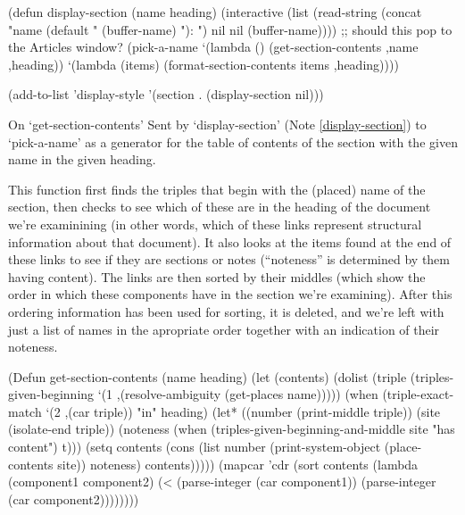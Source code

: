\begin{elisp}
(defun display-section (name heading)
  (interactive (list (read-string
                      (concat
                       "name (default "
                       (buffer-name) "): ")
                      nil nil (buffer-name))))
  ;; should this pop to the Articles window?
  (pick-a-name `(lambda ()
                  (get-section-contents
                   ,name ,heading))
               `(lambda (items)
                  (format-section-contents
                   items ,heading))))

(add-to-list 'display-style
             '(section . (display-section
                          nil)))
\end{elisp}

\begin{notate}{On `get-section-contents'} \label{get-section-contents}
Sent by `display-section' (Note \ref{display-section})
to `pick-a-name' as a generator for the table of contents
of the section with the given name in the given heading.

This function first finds the triples that begin with the
(placed) name of the section, then checks to see which of
these are in the heading of the document we're examinining
(in other words, which of these links represent structural
information about that document).  It also looks at the
items found at the end of these links to see if they are
sections or notes (``noteness'' is determined by them
having content).  The links are then sorted by their
middles (which show the order in which these components
have in the section we're examining).  After this ordering
information has been used for sorting, it is deleted, and
we're left with just a list of names in the apropriate
order together with an indication of their noteness.
\end{notate}

\begin{elisp}
(Defun get-section-contents (name heading)
  (let (contents)
    (dolist (triple (triples-given-beginning
                     `(1 ,(resolve-ambiguity
                           (get-places name)))))
      (when (triple-exact-match
             `(2 ,(car triple)) "in" heading)
        (let* ((number (print-middle triple))
               (site (isolate-end triple))
               (noteness
                (when (triples-given-beginning-and-middle
                       site "has content")
                  t)))
        (setq contents
              (cons (list number
                          (print-system-object
                           (place-contents site))
                          noteness)
                    contents)))))
    (mapcar 'cdr
            (sort contents
                  (lambda (component1 component2)
                    (< (parse-integer (car component1))
                       (parse-integer (car component2))))))))
\end{elisp}

